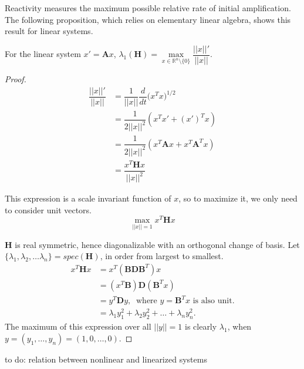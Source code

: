 Reactivity measures the maximum possible relative rate of initial amplification. The following proposition, which relies on elementary linear algebra, shows this result for linear systems. 

\begin{proposition}
	For the linear system $x' = \mathbf{A}x$, $\lambda_1(\mathbf{H}) = \max\limits_{x\in \mathbb{R}^n \setminus \{0\}} \dfrac{||x||'}{||x||}$.
\end{proposition}

\begin{proof}	
	\begin{align*}
		\dfrac{||x||'}{||x||} 	&= \dfrac{1}{||x||} \dfrac{d}{dt}\big(x^Tx\big)^{1/2} \\
										&= \dfrac{1}{2||x||^2} (x^T x' + (x')^T x) \\
										&=  \dfrac{1}{2||x||^2} (x^T \mathbf{A}x + x^T\textbf{A}^Tx) \\
										&= \dfrac{ x^T\mathbf{H}x}{||x||^2}
	\end{align*}

	This expression is a scale invariant function of $x$, so to maximize it, we only need to consider unit vectors. $$\max\limits_{||x||=1} x^T \mathbf{H} x$$
	
	$\mathbf{H}$ is real symmetric, hence diagonalizable with an orthogonal change of basis. Let $\{\lambda_1, \lambda_2, \ldots \lambda_n\} = spec(\mathbf{H})$, in order from largest to smallest.
	\begin{align*}
		x^T\mathbf{H}x &= x^T(\mathbf{BDB}^T)x\\
		&= (x^T\mathbf{B})\mathbf{D}(\mathbf{B}^Tx)\\
		&= y^T \mathbf{D}y, ~\text{  where } y = \mathbf{B}^Tx \text{ is also unit.}\\
		&= \lambda_1 y_1^2 + \lambda_2 y_2^2 + \ldots +\lambda_n y_n^2.
	\end{align*}
The maximum of this expression over all $||y||=1$ is clearly $\lambda_1$, when $y= (y_1, \ldots , y_n) =(1, 0, \ldots, 0)$.

	
	
\end{proof}




to do: relation between nonlinear and linearized systems






